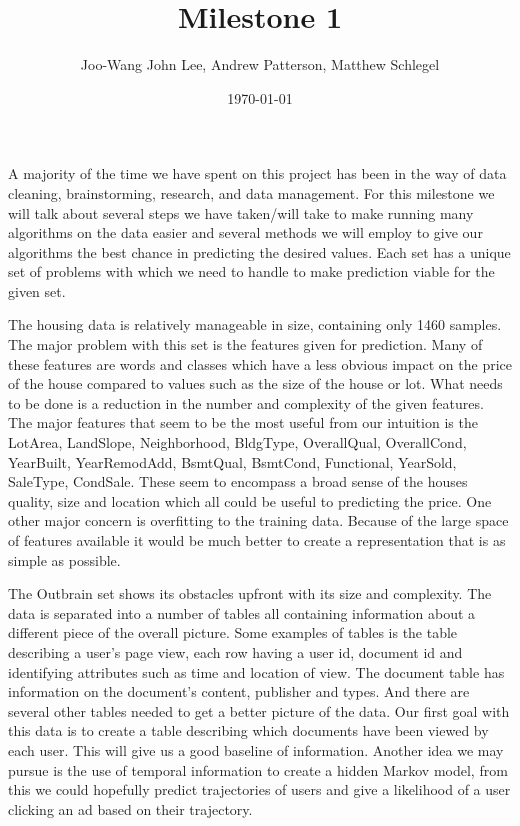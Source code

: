\documentclass{article}
\title{\vspace*{-3cm} Milestone 1}
\author{Joo-Wang John Lee, Andrew Patterson, Matthew Schlegel}
\date{\today}
\begin{document}
\maketitle
\vspace*{0.2cm}

A majority of the time we have spent on this project has been in the way of data cleaning, brainstorming, research, and data management.  For this milestone we will talk about several steps we have taken/will take to make running many algorithms on the data easier and several methods we will employ to give our algorithms the best chance in predicting the desired values. Each set has a unique set of problems with which we need to handle to make prediction viable for the given set.

The housing data is relatively manageable in size, containing only 1460 samples. The major problem with this set is the features given for prediction. Many of these features are words and classes which have a less obvious impact on the price of the house compared to values such as the size of the house or lot.  What needs to be done is a reduction in the number and complexity of the given features. The major features that seem to be the most useful from our intuition is the LotArea, LandSlope, Neighborhood, BldgType, OverallQual, OverallCond, YearBuilt, YearRemodAdd, BsmtQual, BsmtCond, Functional, YearSold, SaleType, CondSale. These seem to encompass a broad sense of the houses quality, size and location which all could be useful to predicting the price. One other major concern is overfitting to the training data. Because of the large space of features available it would be much better to create a representation that is as simple as possible.

The Outbrain set shows its obstacles upfront with its size and complexity. The data is separated into a number of tables all containing information about a different piece of the overall picture. Some examples of tables is the table describing a user’s page view, each row having a user id, document id and identifying attributes such as time and location of view. The document table has information on the document’s content, publisher and types. And there are several other tables needed to get a better picture of the data. Our first goal with this data is to create a table describing which documents have been viewed by each user. This will give us a good baseline of information. Another idea we may pursue is the use of temporal information to create a hidden Markov model, from this we could hopefully predict trajectories of users and give a likelihood of a user clicking an ad based on their trajectory.
\end{document}
